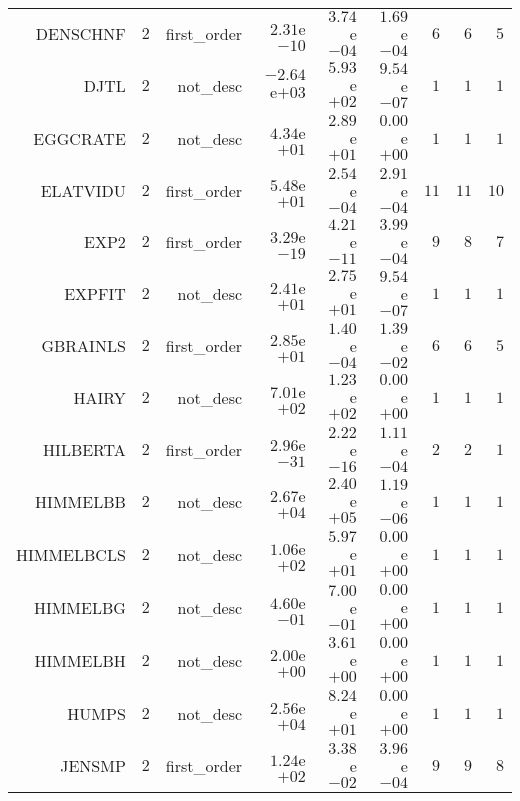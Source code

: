 \begin{longtable}{rrrrrrrrr}
DENSCHNF & \(     2\) & first\_order & \( 2.31\)e\(-10\) & \( 3.74\)e\(-04\) & \( 1.69\)e\(-04\) & \(     6\) & \(     6\) & \(     5\) \\
DJTL & \(     2\) & not\_desc & \(-2.64\)e\(+03\) & \( 5.93\)e\(+02\) & \( 9.54\)e\(-07\) & \(     1\) & \(     1\) & \(     1\) \\
EGGCRATE & \(     2\) & not\_desc & \( 4.34\)e\(+01\) & \( 2.89\)e\(+01\) & \( 0.00\)e\(+00\) & \(     1\) & \(     1\) & \(     1\) \\
ELATVIDU & \(     2\) & first\_order & \( 5.48\)e\(+01\) & \( 2.54\)e\(-04\) & \( 2.91\)e\(-04\) & \(    11\) & \(    11\) & \(    10\) \\
EXP2 & \(     2\) & first\_order & \( 3.29\)e\(-19\) & \( 4.21\)e\(-11\) & \( 3.99\)e\(-04\) & \(     9\) & \(     8\) & \(     7\) \\
EXPFIT & \(     2\) & not\_desc & \( 2.41\)e\(+01\) & \( 2.75\)e\(+01\) & \( 9.54\)e\(-07\) & \(     1\) & \(     1\) & \(     1\) \\
GBRAINLS & \(     2\) & first\_order & \( 2.85\)e\(+01\) & \( 1.40\)e\(-04\) & \( 1.39\)e\(-02\) & \(     6\) & \(     6\) & \(     5\) \\
HAIRY & \(     2\) & not\_desc & \( 7.01\)e\(+02\) & \( 1.23\)e\(+02\) & \( 0.00\)e\(+00\) & \(     1\) & \(     1\) & \(     1\) \\
HILBERTA & \(     2\) & first\_order & \( 2.96\)e\(-31\) & \( 2.22\)e\(-16\) & \( 1.11\)e\(-04\) & \(     2\) & \(     2\) & \(     1\) \\
HIMMELBB & \(     2\) & not\_desc & \( 2.67\)e\(+04\) & \( 2.40\)e\(+05\) & \( 1.19\)e\(-06\) & \(     1\) & \(     1\) & \(     1\) \\
HIMMELBCLS & \(     2\) & not\_desc & \( 1.06\)e\(+02\) & \( 5.97\)e\(+01\) & \( 0.00\)e\(+00\) & \(     1\) & \(     1\) & \(     1\) \\
HIMMELBG & \(     2\) & not\_desc & \( 4.60\)e\(-01\) & \( 7.00\)e\(-01\) & \( 0.00\)e\(+00\) & \(     1\) & \(     1\) & \(     1\) \\
HIMMELBH & \(     2\) & not\_desc & \( 2.00\)e\(+00\) & \( 3.61\)e\(+00\) & \( 0.00\)e\(+00\) & \(     1\) & \(     1\) & \(     1\) \\
HUMPS & \(     2\) & not\_desc & \( 2.56\)e\(+04\) & \( 8.24\)e\(+01\) & \( 0.00\)e\(+00\) & \(     1\) & \(     1\) & \(     1\) \\
JENSMP & \(     2\) & first\_order & \( 1.24\)e\(+02\) & \( 3.38\)e\(-02\) & \( 3.96\)e\(-04\) & \(     9\) & \(     9\) & \(     8\) \\

\end{longtable}
